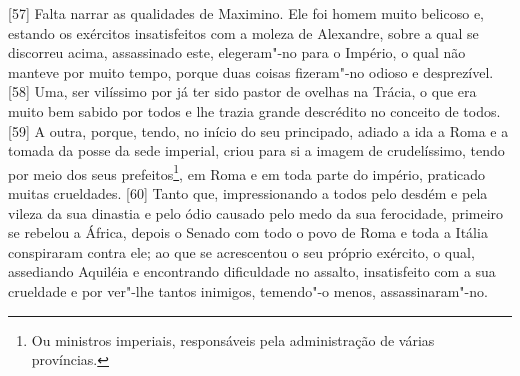 {[}57{]} Falta narrar as qualidades de Maximino. Ele foi homem muito
belicoso e, estando os exércitos insatisfeitos com a moleza de
Alexandre, sobre a qual se discorreu acima, assassinado este,
elegeram"-no para o Império, o qual não manteve por muito tempo, porque
duas coisas fizeram"-no odioso e desprezível. {[}58{]} Uma, ser vilíssimo
por já ter sido pastor de ovelhas na Trácia, o que era muito bem sabido
por todos e lhe trazia grande descrédito no conceito de todos. {[}59{]}
A outra, porque, tendo, no início do seu principado, adiado a ida a Roma
e a tomada da posse da sede imperial, criou para si a imagem de
crudelíssimo, tendo por meio dos seus prefeitos\footnote{Ou ministros
  imperiais, responsáveis pela administração de várias províncias.}, em
Roma e em toda parte do império, praticado muitas crueldades. {[}60{]}
Tanto que, impressionando a todos pelo desdém e pela vileza da sua
dinastia e pelo ódio causado pelo medo da sua ferocidade, primeiro se
rebelou a África, depois o Senado com todo o povo de Roma e toda a
Itália conspiraram contra ele; ao que se acrescentou o seu próprio
exército, o qual, assediando Aquiléia e encontrando dificuldade no
assalto, insatisfeito com a sua crueldade e por ver"-lhe tantos inimigos,
temendo"-o menos, assassinaram"-no.


